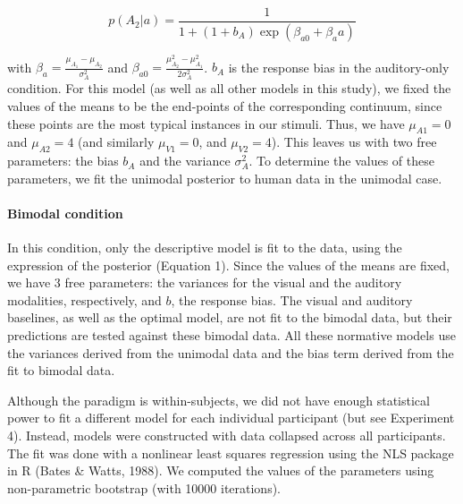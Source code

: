 \documentclass[english,,man,floatsintext]{apa6}
\let\oldparagraph\paragraph
\renewcommand{\paragraph}[1]{\oldparagraph{#1}\mbox{}}
\theoremstyle{definition}
\theoremstyle{definition}
\theoremstyle{definition}
\theoremstyle{remark}
\begin{document}
\[p(A_2 | a)=\frac{1}{1+(1+b_A)\exp(\beta_{a0}+\beta_aa)}\]

with \(\beta_a=\frac{\mu_{A_1}-\mu_{A_2}}{\sigma^2_{A}}\) and
\(\beta_{a0}=\frac{\mu^2_{A_2}-\mu^2_{A_1}}{2\sigma^2_{A}}\). \(b_A\) is
the response bias in the auditory-only condition. For this model (as
well as all other models in this study), we fixed the values of the
means to be the end-points of the corresponding continuum, since these
points are the most typical instances in our stimuli. Thus, we have
\(\mu_{A1}=0\) and \(\mu_{A2}=4\) (and similarly \(\mu_{V1}=0\), and
\(\mu_{V2}=4\)). This leaves us with two free parameters: the bias
\(b_A\) and the variance \(\sigma^2_{A}\). To determine the values of
these parameters, we fit the unimodal posterior to human data in the
unimodal case.

\paragraph{Bimodal condition}\label{bimodal-condition}

In this condition, only the descriptive model is fit to the data, using
the expression of the posterior (Equation 1). Since the values of the
means are fixed, we have 3 free parameters: the variances for the visual
and the auditory modalities, respectively, and \(b\), the response bias.
The visual and auditory baselines, as well as the optimal model, are not
fit to the bimodal data, but their predictions are tested against these
bimodal data. All these normative models use the variances derived from
the unimodal data and the bias term derived from the fit to bimodal
data.

Although the paradigm is within-subjects, we did not have enough
statistical power to fit a different model for each individual
participant (but see Experiment 4). Instead, models were constructed
with data collapsed across all participants. The fit was done with a
nonlinear least squares regression using the NLS package in R (Bates \&
Watts, 1988). We computed the values of the parameters using
non-parametric bootstrap (with 10000 iterations).
\end{document}
